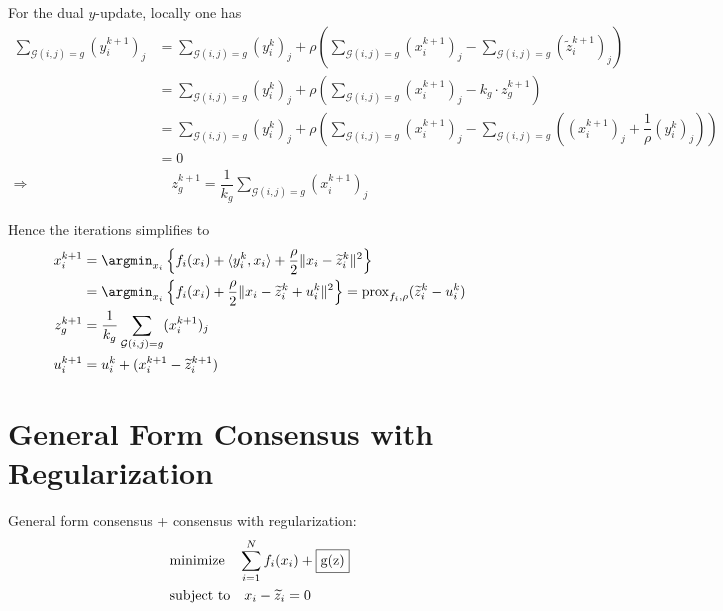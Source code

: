 For the dual $y$-update, locally one has
\begin{align*}
    \sum\limits_{\mathcal{G}(i,j)=g} (y_i^{k+1})_j & = \sum\limits_{\mathcal{G}(i,j)=g} (y_i^k)_j + \rho \left( \sum\limits_{\mathcal{G}(i,j)=g} (x_i^{k+1})_j - \sum\limits_{\mathcal{G}(i,j)=g} (\widetilde{z}_i^{k+1})_j \right) \\
    & = \sum\limits_{\mathcal{G}(i,j)=g} (y_i^k)_j + \rho \left( \sum\limits_{\mathcal{G}(i,j)=g} (x_i^{k+1})_j - k_g\cdot z_g^{k+1} \right) \\
    & = \sum\limits_{\mathcal{G}(i,j)=g} (y_i^k)_j + \rho \left( \sum\limits_{\mathcal{G}(i,j)=g} (x_i^{k+1})_j - \sum\limits_{\mathcal{G}(i,j)=g} \left( (x_i^{k+1})_j + \dfrac{1}{\rho} (y_i^k)_j \right) \right) \\
    & = 0 \\
    \Rightarrow & \quad z_g^{k+1} = \dfrac{1}{k_g} \sum\limits_{\mathcal{G}(i,j)=g} (x_i^{k+1})_j
\end{align*}

Hence the iterations simplifies to
\begin{align*}
    x_i^{k+1} & = \argmin_{x_i} \left\{ f_i(x_i) + \langle y_i^k,x_i \rangle + \dfrac{\rho}{2} \lVert x_i-\widetilde{z}_i^k \rVert^2 \right\} \\
    & = \argmin_{x_i} \left\{ f_i(x_i) + \dfrac{\rho}{2} \lVert x_i - \widetilde{z}_i^k + u_i^k \rVert^2 \right\} = \operatorname{prox}_{f_i,\rho} (\widetilde{z}_i^k - u_i^k) \\
    z_g^{k+1} & = \dfrac{1}{k_g} \sum\limits_{\mathcal{G}(i,j)=g} (x_i^{k+1})_j \\
    u_i^{k+1} & = u_i^k + (x_i^{k+1} - \widetilde{z}^{k+1}_i)
\end{align*}

\section{General Form Consensus with Regularization}
General form consensus + consensus with regularization:
\begin{align*}
    & \text{minimize} \quad \sum\limits_{i=1}^N f_i(x_i) + \framebox{g(z)} \\
    & \text{subject to} \quad x_i - \widetilde{z}_i = 0
\end{align*}


